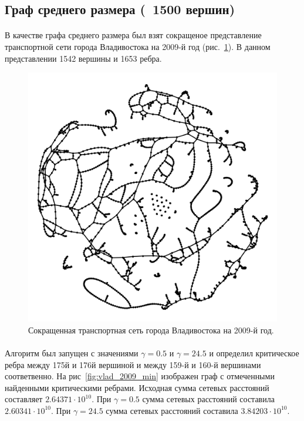 \documentclass[12pt]{article}
\begin{document}
\subsection{Граф среднего размера (~1500 вершин)}

\paragraph{}
В качестве графа среднего размера был взят сокращеное представление 
транспортной сети города Владивостока на 2009-й год (рис.~\ref{fig:vlad_2009}). 
В данном представлении 1542 вершины и 1653 ребра.

\begin{figure}[h]
    \centering
    \includegraphics[scale=0.3]{vlad_2009.png}
    \caption{Сокращенная транспортная сеть города Владивостока на 2009-й год.}
    \label{fig:vlad_2009}
\end{figure}

\paragraph{}
Алгоритм был запущен с значениями $\gamma = 0.5$ и $\gamma = 24.5$ и определил 
критическое ребра между 175й и 176й вершиной и между 159-й и 160-й вершинами соответвенно.
На рис~\ref{fig:vlad_2009_min} изображен граф с отмеченными найденными критическими ребрами.
Исходная сумма сетевых расстояний составляет $2.64371\cdot10^{10}$.
При $\gamma = 0.5$ сумма сетевых расстояний составила $2.60341\cdot10^{10}$. 
При $\gamma = 24.5$ сумма сетевых расстояний составила $3.84203\cdot10^{10}$.
\end{document}

